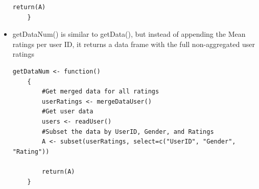 \documentclass[11pt]{article}  %
\begin{document}
\begin{itemize}
\begin{lstlisting}[basicstyle=\small]
    	return(A)
    }
    \end{lstlisting}
    
    \item getDataNum() is similar to getData(), but instead of appending the Mean ratings per user ID, it returns a data frame with the full non-aggregated user ratings
    \begin{lstlisting}[basicstyle=\small]
    getDataNum <- function()
    {
    	#Get merged data for all ratings
    	userRatings <- mergeDataUser()
    	#Get user data
    	users <- readUser()
    	#Subset the data by UserID, Gender, and Ratings
    	A <- subset(userRatings, select=c("UserID", "Gender", "Rating"))
    
    	return(A)
    }
    \end{lstlisting}
\end{itemize}

\end{document}
